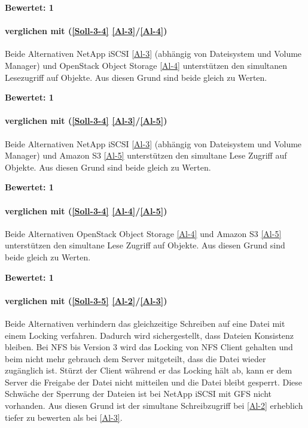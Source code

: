 \textbf{Bewertet: 1}

\paragraph*{  verglichen mit  (\ref{Soll-3-4} \ref{Al-3}/\ref{Al-4})}
Beide Alternativen NetApp iSCSI \ref{Al-3} (abhängig von Dateisystem und Volume Manager) und OpenStack Object Storage \ref{Al-4} unterstützen den simultanen Lesezugriff auf Objekte. Aus diesen Grund sind beide gleich zu Werten.

\textbf{Bewertet: 1}

\paragraph*{  verglichen mit  (\ref{Soll-3-4} \ref{Al-3}/\ref{Al-5})}
Beide Alternativen NetApp iSCSI \ref{Al-3} (abhängig von Dateisystem und Volume Manager) und Amazon S3 \ref{Al-5} unterstützen den simultane Lese Zugriff auf Objekte. Aus diesen Grund sind beide gleich zu Werten.

\textbf{Bewertet: 1}


\paragraph*{  verglichen mit  (\ref{Soll-3-4} \ref{Al-4}/\ref{Al-5})}
Beide Alternativen OpenStack Object Storage \ref{Al-4} und Amazon S3 \ref{Al-5} unterstützen den simultane Lese Zugriff auf Objekte. Aus diesen Grund sind beide gleich zu Werten.


\textbf{Bewertet: 1}


\paragraph*{  verglichen mit  (\ref{Soll-3-5} \ref{Al-2}/\ref{Al-3})}
Beide Alternativen verhindern das gleichzeitige Schreiben auf eine Datei mit einem Locking verfahren. Dadurch wird sichergestellt, dass Dateien Konsistenz bleiben. Bei NFS bis Version 3 wird das Locking von NFS Client gehalten und beim nicht mehr gebrauch dem Server mitgeteilt, dass die Datei wieder zugänglich ist. Stürzt der Client während er das Locking hält ab, kann er dem Server die Freigabe der Datei nicht mitteilen und die Datei bleibt gesperrt. 
Diese Schwäche der Sperrung der Dateien ist bei NetApp iSCSI mit GFS nicht vorhanden. Aus diesen Grund ist der simultane Schreibzugriff bei  \ref{Al-2} erheblich tiefer zu bewerten als bei   \ref{Al-3}.

